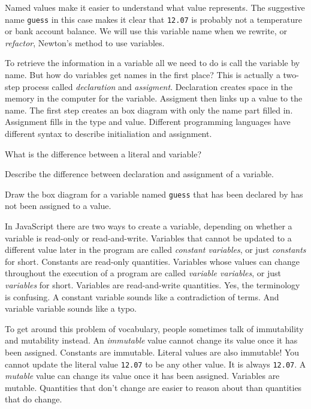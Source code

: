 Named values make it easier to understand what value represents. The suggestive name \texttt{guess} in this case makes it clear that \texttt{12.07} is probably not a temperature or bank account balance. We will use this variable name when we rewrite, or \emph{refactor}, Newton's method to use variables.

To retrieve the information in a variable all we need to do is call the variable by name. But how do variables get names in the first place? This is actually a two-step process called \emph{declaration} and \emph{assigment}. Declaration creates space in the memory in the computer for the variable. Assigment then links up a value to the name. The first step creates an box diagram with only the name part filled in. Assignment fills in the type and value. Different programming languages have different syntax to describe initialiation and assignment.

\begin{question}
  What is the difference between a literal and variable?
\end{question}

\begin{question}
  Describe the difference between declaration and assignment of a variable.
\end{question}

\begin{question}
  Draw the box diagram for a variable named \texttt{guess} that has been declared by has not been assigned to a value.
\end{question}

In JavaScript there are two ways to create a variable, depending on whether a variable is read-only or read-and-write. Variables that cannot be updated to a different value later in the program are called \emph{constant variables}, or just \emph{constants} for short. Constants are read-only quantities. Variables whose values can change throughout the execution of a program are called \emph{variable variables}, or just \emph{variables} for short. Variables are read-and-write quantities. Yes, the terminology is confusing. A constant variable sounds like a contradiction of terms. And variable variable sounds like a typo.

To get around this problem of vocabulary, people sometimes talk of immutability and mutability instead. An \emph{immutable} value cannot change its value once it has been assigned. Constants are immutable. Literal values are also immutable! You cannot update the literal value \texttt{12.07} to be any other value. It is always \texttt{12.07}. A \emph{mutable} value can change its value once it has been assigned. Variables are mutable. Quantities that don't change are easier to reason about than quantities that do change.

